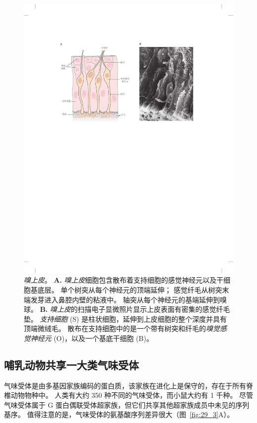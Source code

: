 \begin{figure}[htbp]
	\centering
	\includegraphics[width=0.8\linewidth]{chap29/fig_29_2}
	\caption{\textit{嗅上皮}。
	\textbf{A.} \textit{嗅上皮}细胞包含散布着支持细胞的感觉神经元以及干细胞基底层。
	单个树突从每个神经元的顶端延伸；
	感觉纤毛从树突末端发芽进入鼻腔内壁的粘液中。
	轴突从每个神经元的基端延伸到嗅球。
	\textbf{B.} \textit{嗅上皮}的扫描电子显微照片显示上皮表面有密集的感觉纤毛垫。
	\textit{支持细胞} (S) 是柱状细胞，延伸到上皮细胞的整个深度并具有顶端微绒毛。
	散布在支持细胞中的是一个带有树突和纤毛的\textit{嗅觉感觉神经元} (O)，以及一个基底干细胞 (B)。}
	\label{fig:29_2}
\end{figure}



\subsection{哺乳动物共享一大类气味受体}

气味受体是由多基因家族编码的蛋白质，该家族在进化上是保守的，存在于所有脊椎动物物种中。
人类有大约 350 种不同的气味受体，而小鼠大约有 1 千种。 
尽管气味受体属于 G 蛋白偶联受体超家族，但它们共享其他超家族成员中未见的序列基序。
值得注意的是，气味受体的氨基酸序列差异很大（图~\ref{fig:29_3}A）。


